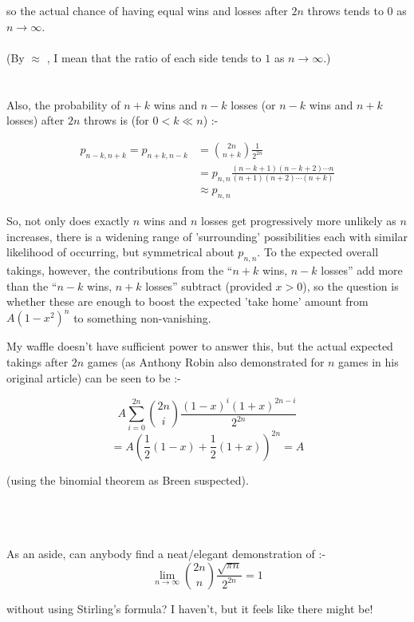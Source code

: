 \documentclass{article}
\begin{document}
\begin{flushleft}
so the actual chance of having equal wins and losses after $2n$ throws tends to $0$ as $n \to \infty$.\\ \ \\ (By $\approx$ , I mean that the ratio of each side tends to $1$ as $n \to \infty$.)\\ \ \\ \ \\ Also, the probability of $n+k$ wins and $n-k$ losses (or $n-k$ wins and $n+k$ losses) after $2n$ throws is (for $0<k \ll n$) :-

\begin{align}
p_{n-k,n+k} = p_{n+k,n-k} &= \binom{2n}{n+k}\frac{1}{2^{2n}} \\ &= p_{n,n}\frac{(n-k+1)(n-k+2)\cdots n}{(n+1)(n+2)\cdots (n+k)} \\ &\approx p_{n,n} \end{align}

So, not only does exactly $n$ wins and $n$ losses get progressively more unlikely as $n$ increases, there is a widening range of 'surrounding' possibilities each with similar likelihood of occurring, but symmetrical about $p_{n,n}$.
To the expected overall takings, however, the contributions from the ``$n+k$ wins, $n-k$ losses'' add more than the ``$n-k$ wins, $n+k$ losses'' subtract (provided $x > 0$), so the question is whether these are enough to boost the expected 'take home' amount from $A(1-x^{2})^n$ to something non-vanishing.

My waffle doesn't have sufficient power to answer this, but the actual expected takings after $2n$ games (as Anthony Robin also demonstrated for $n$ games in his original article) can be seen to be :-

\begin{equation} \label{eq:C}
A \sum_{i=0}^{2n}\binom{2n}{i} \frac{(1-x)^{i}(1+x)^{2n-i}}{2^{2n}}
\end{equation}
\begin{equation} \label{eq:D}
= A \left(\frac{1}{2}(1-x) + \frac{1}{2}(1+x)\right)^{2n} = A \end{equation}

(using the binomial theorem as Breen suspected).

\ \\
\ \\
\ \\
As an aside, can anybody find a neat/elegant demonstration of :- \begin{equation} \label{eq:E} \lim_{n \to \infty}\binom{2n}{n}\frac{\sqrt{\pi n}}{2^{2n}} = 1 \end{equation}

without using Stirling's formula?
I haven't, but it feels like there might be!







\end{flushleft}
\end{document}
